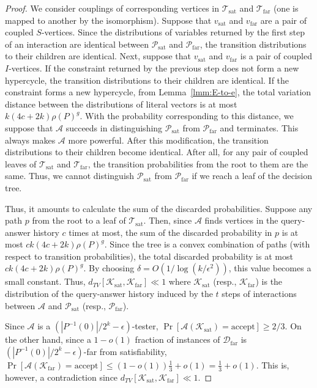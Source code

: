 \documentclass[letterpaper,11pt]{article}
\newcommand{\dtv}{d_{TV}}
\newcommand{\calpsat}{\mathcal{P}_{\mathrm{sat}}}
\newcommand{\calpfar}{\mathcal{P}_{\mathrm{far}}}
\newcommand{\caldfar}{\mathcal{D}_{\mathrm{far}}}
\newcommand{\calksat}{\mathcal{K}_{\mathrm{sat}}}
\newcommand{\calkfar}{\mathcal{K}_{\mathrm{far}}}
\newcommand{\caltsat}{\mathcal{T}_{\mathrm{sat}}}
\newcommand{\caltfar}{\mathcal{T}_{\mathrm{far}}}
\newcommand{\cala}{\mathcal{A}}
\begin{document}
\begin{proof}
  We consider couplings of corresponding vertices in $\caltsat$ and $\caltfar$ (one is mapped to another by the isomorphism).
  Suppose that $v_{\mathrm{sat}}$ and $v_{\mathrm{far}}$ are a pair of coupled $S$-vertices.
  Since the distributions of variables returned by the first step of an interaction are identical between $\calpsat$ and $\calpfar$,
  the transition distributions to their children are identical.
  Next, suppose that $v_{\mathrm{sat}}$ and $v_{\mathrm{far}}$ is a pair of coupled $I$-vertices.
  If the constraint returned by the previous step does not form a new hypercycle,
  the transition distributions to their children are identical.
  If the constraint forms a new hypercycle,
  from Lemma~\ref{lmm:E-to-e},
  the total variation distance between the distributions of literal vectors is at most $k(4c+2k)\rho(P)^g$.
  With the probability corresponding to this distance,
  we suppose that $\cala$ succeeds in distinguishing $\calpsat$ from $\calpfar$ and terminates.
  This always makes $\cala$ more powerful.
  After this modification, 
  the transition distributions to their children become identical.
  After all, for any pair of coupled leaves of $\caltsat$ and $\caltfar$, 
  the transition probabilities from the root to them are the same.
  Thus, we cannot distinguish $\calpsat$ from $\calpfar$ if we reach a leaf of the decision tree.

  Thus, it amounts to calculate the sum of the discarded probabilities.
  Suppose any path $p$ from the root to a leaf of $\caltsat$.
  Then, since $\cala$ finds vertices in the query-answer history $c$ times at most,
  the sum of the discarded probability in $p$ is at most $ck(4c+2k)\rho(P)^g$.
  Since the tree is a convex combination of paths (with respect to transition probabilities),
  the total discarded probability is at most $ck(4c+2k)\rho(P)^g$.
  By choosing $\delta=O(1/\log (k/\epsilon^2))$, this value becomes a small constant.
  Thus, $\dtv[\calksat,\calkfar] \ll 1$ where $\calksat$ (resp., $\calkfar$) is the distribution of the query-answer history induced by the $t$ steps of interactions between $\cala$ and $\calpsat$ (resp., $\calpfar$).

  Since $\cala$ is a $(|P^{-1}(0)|/2^k-\epsilon)$-tester, 
  $\Pr[\cala(\calksat)=\mathrm{accept}]\geq 2/3$.
  On the other hand, 
  since a $1-o(1)$ fraction of instances of $\caldfar$ is $(|P^{-1}(0)|/2^k-\epsilon)$-far from satisfiability,
  $\Pr[\cala(\calkfar)=\mathrm{accept}]\leq (1-o(1))\frac{1}{3}+o(1)=\frac{1}{3}+o(1)$.
  This is, however, a contradiction since $\dtv[\calksat,\calkfar] \ll 1 $.
\end{proof}
\end{document}
